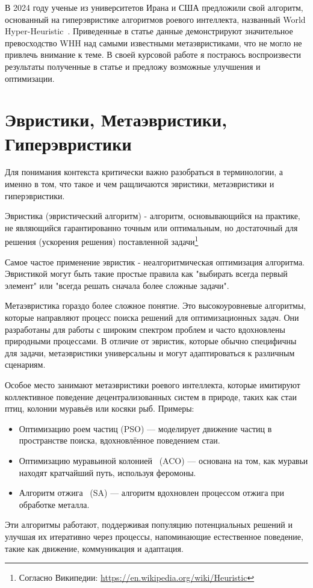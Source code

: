 \documentclass[a4paper,12pt]{extarticle}
\begin{document}
В 2024 году ученые из университетов Ирана и США предложили свой алгоритм, основанный на гиперэвристике алгоритмов роевого интеллекта, названный World Hyper-Heuristic~\cite{WHH}. Приведенные в статье данные демонстрируют значительное превосходство WHH над самыми известными метаэвристиками, что не могло не привлечь внимание к теме. В своей курсовой работе я постраюсь воспроизвести результаты полученные в статье и предложу возможные улучшения и оптимизации.

\section{Эвристики, Метаэвристики, Гиперэвристики}

Для понимания контекста критически важно разобраться в терминологии, а именно в том, что такое и чем ращличаются эвристики, метаэвристики и гиперэвристики.

Эвристика (эвристический алгоритм) - алгоритм, основывающийся на практике, не являющийся гарантированно точным или оптимальным, но достаточный для решения (ускорения решения) поставленной задачи\footnote{Согласно Википедии: \url{https://en.wikipedia.org/wiki/Heuristic}}

Самое частое применение эвристик - неалгоритмическая оптимизация алгоритма. Эвристикой могут быть такие простые правила как "выбирать всегда первый элемент" или "всегда решать сначала более сложные задачи".

Метаэвристика гораздо более сложное понятие. Это высокоуровневые алгоритмы, которые направляют процесс поиска решений для оптимизационных задач. Они разработаны для работы с широким спектром проблем и часто вдохновлены природными процессами. В отличие от эвристик, которые обычно специфичны для задачи, метаэвристики универсальны и могут адаптироваться к различным сценариям.

Особое место занимают метаэвристики роевого интеллекта, которые имитируют коллективное поведение децентрализованных систем в природе, таких как стаи птиц, колонии муравьёв или косяки рыб. Примеры:
\begin{itemize}
    \item Оптимизацию роем частиц (PSO) — моделирует движение частиц в пространстве поиска, вдохновлённое поведением стаи.
    \item Оптимизацию муравьиной колонией~\cite{ACO} (ACO) — основана на том, как муравьи находят кратчайший путь, используя феромоны.
    \item Алгоритм отжига~\cite{SA} (SA) — алгоритм вдохновлен процессом отжига при обработке металла.
\end{itemize}
Эти алгоритмы работают, поддерживая популяцию потенциальных решений и улучшая их итеративно через процессы, напоминающие естественное поведение, такие как движение, коммуникация и адаптация.
\end{document}
